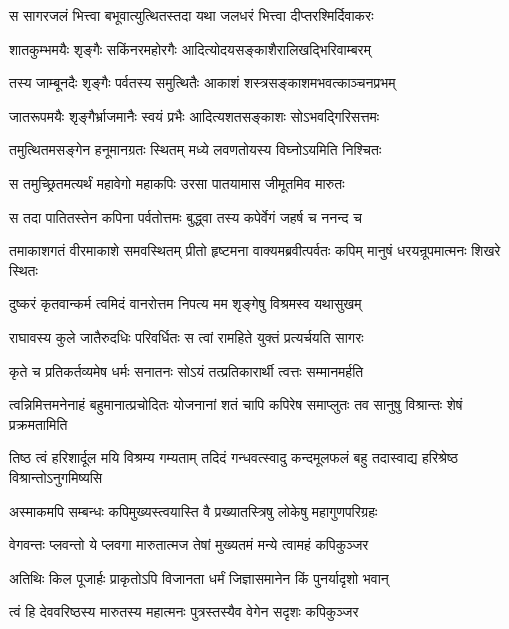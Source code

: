 \twolineshloka
{स सागरजलं भित्त्वा बभूवात्युत्थितस्तदा}
{यथा जलधरं भित्त्वा दीप्तरश्मिर्दिवाकरः} %

\twolineshloka
{शातकुम्भमयैः शृङ्गैः सकिंनरमहोरगैः}
{आदित्योदयसङ्काशैरालिखद्भिरिवाम्बरम्} %

\twolineshloka
{तस्य जाम्बूनदैः शृङ्गैः पर्वतस्य समुत्थितैः}
{आकाशं शस्त्रसङ्काशमभवत्काञ्चनप्रभम्} %

\twolineshloka
{जातरूपमयैः शृङ्गैर्भ्राजमानैः स्वयं प्रभैः}
{आदित्यशतसङ्काशः सोऽभवद्गिरिसत्तमः} %

\twolineshloka
{तमुत्थितमसङ्गेन हनूमानग्रतः स्थितम्}
{मध्ये लवणतोयस्य विघ्नोऽयमिति निश्चितः} %

\twolineshloka
{स तमुच्छ्रितमत्यर्थं महावेगो महाकपिः}
{उरसा पातयामास जीमूतमिव मारुतः} %

\twolineshloka
{स तदा पातितस्तेन कपिना पर्वतोत्तमः}
{बुद्ध्वा तस्य कपेर्वेगं जहर्ष च ननन्द च} %

\threelineshloka
{तमाकाशगतं वीरमाकाशे समवस्थितम्}
{प्रीतो हृष्टमना वाक्यमब्रवीत्पर्वतः कपिम्}
{मानुषं धरयन्रूपमात्मनः शिखरे स्थितः} %

\twolineshloka
{दुष्करं कृतवान्कर्म त्वमिदं वानरोत्तम}
{निपत्य मम शृङ्गेषु विश्रमस्व यथासुखम्} %

\twolineshloka
{राघावस्य कुले जातैरुदधिः परिवर्धितः}
{स त्वां रामहिते युक्तं प्रत्यर्चयति सागरः} %

\twolineshloka
{कृते च प्रतिकर्तव्यमेष धर्मः सनातनः}
{सोऽयं तत्प्रतिकारार्थी त्वत्तः सम्मानमर्हति} %

\threelineshloka
{त्वन्निमित्तमनेनाहं बहुमानात्प्रचोदितः}
{योजनानां शतं चापि कपिरेष समाप्लुतः}
{तव सानुषु विश्रान्तः शेषं प्रक्रमतामिति} %

\threelineshloka
{तिष्ठ त्वं हरिशार्दूल मयि विश्रम्य गम्यताम्}
{तदिदं गन्धवत्स्वादु कन्दमूलफलं बहु}
{तदास्वाद्य हरिश्रेष्ठ विश्रान्तोऽनुगमिष्यसि} %

\twolineshloka
{अस्माकमपि सम्बन्धः कपिमुख्यस्त्वयास्ति वै}
{प्रख्यातस्त्रिषु लोकेषु महागुणपरिग्रहः} %

\twolineshloka
{वेगवन्तः प्लवन्तो ये प्लवगा मारुतात्मज}
{तेषां मुख्यतमं मन्ये त्वामहं कपिकुञ्जर} %

\twolineshloka
{अतिथिः किल पूजार्हः प्राकृतोऽपि विजानता}
{धर्मं जिज्ञासमानेन किं पुनर्यादृशो भवान्} %

\twolineshloka
{त्वं हि देववरिष्ठस्य मारुतस्य महात्मनः}
{पुत्रस्तस्यैव वेगेन सदृशः कपिकुञ्जर} %

